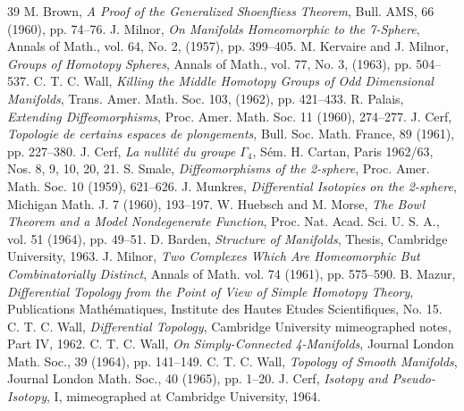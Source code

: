 \begin{thebibliography}{39}
 M. Brown, \emph{A Proof of the Generalized Shoenfliess Theorem}, Bull. AMS, 66 (1960), pp. 74--76.
 J. Milnor, \emph{On Manifolds Homeomorphic to the 7-Sphere}, Annals of Math., vol. 64, No. 2, (1957), pp. 399--405.
 M. Kervaire and J. Milnor, \emph{Groups of Homotopy Spheres}, Annals of Math., vol. 77, No. 3, (1963), pp. 504--537.
 C. T. C. Wall, \emph{Killing the Middle Homotopy Groups of Odd Dimensional Manifolds}, Trans. Amer. Math. Soc. 103, (1962), pp. 421--433.
 R. Palais, \emph{Extending Diffeomorphisms}, Proc. Amer. Math. Soc. 11 (1960), 274--277.
 J. Cerf, \emph{Topologie de certains espaces de plongements}, Bull. Soc. Math. France, 89 (1961), pp. 227--380.
 J. Cerf, \emph{La nullit\'e du groupe $\Gamma_4$}, S\'em. H. Cartan, Paris 1962/63, Nos. 8, 9, 10, 20, 21.
 S. Smale, \emph{Diffeomorphisms of the 2-sphere}, Proc. Amer. Math. Soc. 10 (1959), 621--626.
 J. Munkres, \emph{Differential Isotopies on the 2-sphere}, Michigan Math. J. 7 (1960), 193--197.
 W. Huebsch and M. Morse, \emph{The Bowl Theorem and a Model Nondegenerate Function}, Proc. Nat. Acad. Sci. U. S. A., vol. 51 (1964), pp. 49--51.
 D. Barden, \emph{Structure of Manifolds}, Thesis, Cambridge University, 1963.
 J. Milnor, \emph{Two Complexes Which Are Homeomorphic But Combinatorially Distinct}, Annals of Math. vol. 74 (1961), pp. 575--590.
 B. Mazur, \emph{Differential Topology from the Point of View of Simple Homotopy Theory}, Publications Math\'ematiques, Institute des Hautes Etudes Scientifiques, No. 15.
 C. T. C. Wall, \emph{Differential Topology}, Cambridge University mimeographed notes, Part IV, 1962.
 C. T. C. Wall, \emph{On Simply-Connected 4-Manifolds}, Journal London Math. Soc., 39 (1964), pp. 141--149.
 C. T. C. Wall, \emph{Topology of Smooth Manifolds}, Journal London Math. Soc., 40 (1965), pp. 1--20.
 J. Cerf, \emph{Isotopy and Pseudo-Isotopy}, I, mimeographed at Cambridge University, 1964.
\end{thebibliography}
